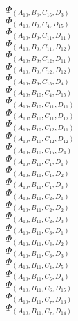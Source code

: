 \documentclass[14pt]{article}
\begin{document}
    $\Phi_{({A}_{10}, {B}_{8}, {C}_{15}, {D}_{3})}$ \\ 
    $\Phi_{({A}_{10}, {B}_{9}, {C}_{4}, {D}_{15})}$ \\ 
    $\Phi_{({A}_{10}, {B}_{9}, {C}_{11}, {D}_{11})}$ \\ 
    $\Phi_{({A}_{10}, {B}_{9}, {C}_{11}, {D}_{12})}$ \\ 
    $\Phi_{({A}_{10}, {B}_{9}, {C}_{12}, {D}_{11})}$ \\ 
    $\Phi_{({A}_{10}, {B}_{9}, {C}_{12}, {D}_{12})}$ \\ 
    $\Phi_{({A}_{10}, {B}_{9}, {C}_{15}, {D}_{4})}$ \\ 
    $\Phi_{({A}_{10}, {B}_{10}, {C}_{4}, {D}_{15})}$ \\ 
    $\Phi_{({A}_{10}, {B}_{10}, {C}_{11}, {D}_{11})}$ \\ 
    $\Phi_{({A}_{10}, {B}_{10}, {C}_{11}, {D}_{12})}$ \\ 
    $\Phi_{({A}_{10}, {B}_{10}, {C}_{12}, {D}_{11})}$ \\ 
    $\Phi_{({A}_{10}, {B}_{10}, {C}_{12}, {D}_{12})}$ \\ 
    $\Phi_{({A}_{10}, {B}_{10}, {C}_{15}, {D}_{4})}$ \\ 
    $\Phi_{({A}_{10}, {B}_{11}, {C}_{1}, {D}_{1})}$ \\ 
    $\Phi_{({A}_{10}, {B}_{11}, {C}_{1}, {D}_{2})}$ \\ 
    $\Phi_{({A}_{10}, {B}_{11}, {C}_{1}, {D}_{3})}$ \\ 
    $\Phi_{({A}_{10}, {B}_{11}, {C}_{2}, {D}_{1})}$ \\ 
    $\Phi_{({A}_{10}, {B}_{11}, {C}_{2}, {D}_{2})}$ \\ 
    $\Phi_{({A}_{10}, {B}_{11}, {C}_{2}, {D}_{3})}$ \\ 
    $\Phi_{({A}_{10}, {B}_{11}, {C}_{3}, {D}_{1})}$ \\ 
    $\Phi_{({A}_{10}, {B}_{11}, {C}_{3}, {D}_{2})}$ \\ 
    $\Phi_{({A}_{10}, {B}_{11}, {C}_{3}, {D}_{3})}$ \\ 
    $\Phi_{({A}_{10}, {B}_{11}, {C}_{4}, {D}_{5})}$ \\ 
    $\Phi_{({A}_{10}, {B}_{11}, {C}_{5}, {D}_{4})}$ \\ 
    $\Phi_{({A}_{10}, {B}_{11}, {C}_{6}, {D}_{15})}$ \\ 
    $\Phi_{({A}_{10}, {B}_{11}, {C}_{7}, {D}_{13})}$ \\ 
    $\Phi_{({A}_{10}, {B}_{11}, {C}_{7}, {D}_{14})}$ \\ 
\end{document}

